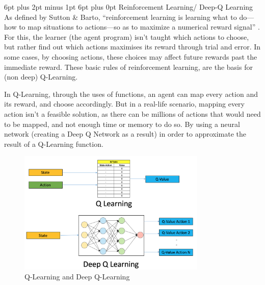 \documentclass[12pt,a4paper]{article}
\makeatletter
\renewcommand\subsection{\@startsection {subsection}{1}{2mm} %
                               {6pt plus 2pt minus 1pt} %
                               {6pt plus 0pt} %
                               {\normalfont\bfseries}}
\makeatother
\begin{document}
\subsection{Reinforcement Learning/ Deep-Q Learning}
As defined by Sutton \& Barto, “reinforcement learning is learning what to do—how to map situations to actions—so as to maximize a numerical reward signal” \cite{richard_s._sutton_reinforcement_1998}. For this, the learner (the agent program) isn’t taught which actions to choose, but rather find out which actions maximises its reward through trial and error. In some cases, by choosing actions, these choices may affect future rewards past the immediate reward. 
These basic rules of reinforcement learning, are the basis for (non deep) Q-Learning.\par
In Q-Learning, through the uses of functions, an agent can map every action and its reward, and choose accordingly. But in a real-life scenario, mapping every action isn’t a feasible solution, as there can be millions of actions that would need to be mapped, and not enough time or memory to do so. By using a neural network (creating a Deep Q Network as a result) in order to approximate the result of a Q-Learning function.\par
\begin{figure}[h]
	\includegraphics[width=0.8\textwidth]{deepQ}
	\centering
	\caption{Q-Learning and Deep Q-Learning \protect \cite{noauthor_picbreeder_noyear}}
	\label{fig:8}
\end{figure}
\newpage
	\raggedright
	
	
\end{document}
